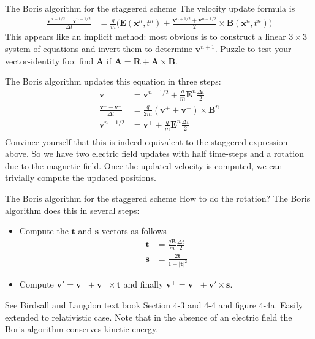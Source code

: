\documentclass[pdf]{beamer}
\newcommand{\mvec}[1]{\mathbf{#1}}
\theoremstyle{definition}
\begin{document}
\begin{frame}{The Boris algorithm for the staggered scheme}
  \footnotesize%
  The velocity update formula is
  \begin{align*}
    \frac{\mvec{v}^{n+1/2}-\mvec{v}^{n-1/2}}{\Delta t} &= \frac{q}{m}
      \big(
        \mvec{E}(\mvec{x}^n,t^n) +
        \frac{\mvec{v}^{n+1/2}+\mvec{v}^{n-1/2}}{2}\times\mvec{B}(\mvec{x}^n,t^n)
      \big)
  \end{align*}
  This appears like an implicit method: most obvious is to construct a
  linear $3\times 3$ system of equations and invert them to determine
  $\mvec{v}^{n+1}$. Puzzle to test your vector-identity foo: find
  $\mvec{A}$ if $\mvec{A} = \mvec{R}+\mvec{A}\times\mvec{B}$.

  The Boris algorithm updates this equation in three steps:
  \begin{align*}
    \mvec{v}^- &= \mvec{v}^{n-1/2} + \frac{q}{m}\mvec{E}^n\frac{\Delta t}{2} \\
    \frac{\mvec{v}^+- \mvec{v}^-}{\Delta t}
    &=
      \frac{q}{2 m}(\mvec{v}^++\mvec{v}^-)\times\mvec{B}^n \\
    \mvec{v}^{n+1/2}
    &=
      \mvec{v}^{+} + \frac{q}{m}\mvec{E}^n\frac{\Delta t}{2} \\    
  \end{align*}
  Convince yourself that this is indeed equivalent to the staggered
  expression above. So we have two electric field updates with half
  time-steps and a rotation due to the magnetic field. Once the
  updated velocity is computed, we can trivially compute the updated
  positions.
\end{frame}

\begin{frame}{The Boris algorithm for the staggered scheme}
  How to do the rotation? The Boris algorithm does this in several
  steps:
  \begin{itemize}
  \item Compute the $\mvec{t}$ and $\mvec{s}$ vectors as follows
    \begin{align*}
      \mvec{t} &= \frac{q\mvec{B}}{m}\frac{\Delta t}{2} \\
      \mvec{s} &= \frac{2\mvec{t}}{1+|\mvec{t}|^2}
    \end{align*}
  \item Compute $\mvec{v}' = \mvec{v}^- + \mvec{v}^-\times\mvec{t}$
    and finally $\mvec{v}^+ = \mvec{v}^-+\mvec{v}'\times\mvec{s}$.
  \end{itemize}
  See Birdsall and Langdon text book Section 4-3 and 4-4 and figure
  4-4a. Easily extended to relativistic case.%
  \vskip0.1in%
  Note that in the absence of an electric field the Boris algorithm
  conserves kinetic energy.
\end{frame}
\end{document}

